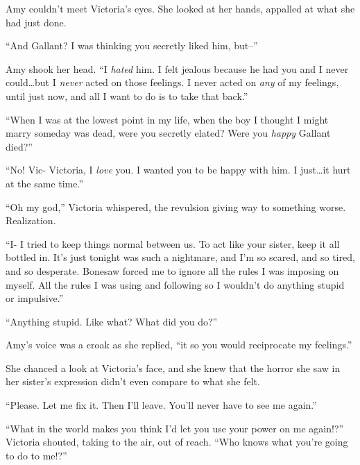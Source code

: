 Amy couldn't meet Victoria's eyes.  She looked at her hands, appalled at what she had just done.



``And Gallant?  I was thinking you secretly liked him, but--''



Amy shook her head.  ``I \emph{hated} him.  I felt jealous because he had you and I never could\ldots but I \emph{never} acted on those feelings.  I never acted on \emph{any} of my feelings, until just now, and all I want to do is to take that back.''



``When I was at the lowest point in my life, when the boy I thought I might marry someday was dead, were you secretly elated?  Were you \emph{happy} Gallant died?''



``No!  Vic- Victoria, I \emph{love} you.  I wanted you to be happy with him.  I just\ldots it hurt at the same time.''



``Oh my god,'' Victoria whispered, the revulsion giving way to something worse.  Realization.



``I- I tried to keep things normal between us.  To act like your sister, keep it all bottled in.  It's just tonight was such a nightmare, and I'm so scared, and so tired, and so desperate.  Bonesaw forced me to ignore all the rules I was imposing on myself.  All the rules I was using and following so I wouldn't do anything stupid or impulsive.''



``Anything stupid.  Like what?  What did you do?''



Amy's voice was a croak as she replied, ``\ldotsmake it so you would reciprocate my feelings.''



She chanced a look at Victoria's face, and she knew that the horror she saw in her sister's expression didn't even compare to what she felt.



``Please.  Let me fix it.  Then I'll leave.  You'll never have to see me again.''



``What in the world makes you think I'd let you use your power on me again!?''  Victoria shouted, taking to the air, out of reach.  ``Who knows what you're going to do to me!?''



